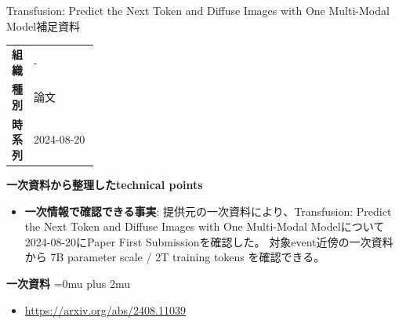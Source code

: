 \begin{technicalnote}{Transfusion: Predict the Next Token and Diffuse Images with One Multi-Modal Model}{補足資料}
\begingroup
\begin{tabularx}{\linewidth}{@{}>{\bfseries}p{0.22\linewidth}X@{}}
組織 & - \\
種別 & 論文 \\
時系列 & 2024-08-20 \\
\end{tabularx}
\smallskip
{\bfseries 一次資料から整理したtechnical points}
\begin{itemize}[leftmargin=1.5em,itemsep=0.35em]
\item \textbf{一次情報で確認できる事実}: 提供元の一次資料により、Transfusion: Predict the Next Token and Diffuse Images with One Multi-Modal Modelについて2024-08-20にPaper First Submissionを確認した。 対象event近傍の一次資料から 7B parameter scale / 2T training tokens を確認できる。
\end{itemize}
\begin{minipage}{\linewidth}
\begin{samepage}
{\bfseries 一次資料}
\begingroup\sloppy
\Urlmuskip=0mu plus 2mu\relax
\begin{itemize}[leftmargin=1.5em,itemsep=0.25em]
\item {\scriptsize\url{https://arxiv.org/abs/2408.11039}}
\end{itemize}
\endgroup
\end{samepage}
\end{minipage}
\endgroup
\end{technicalnote}
\medskip

